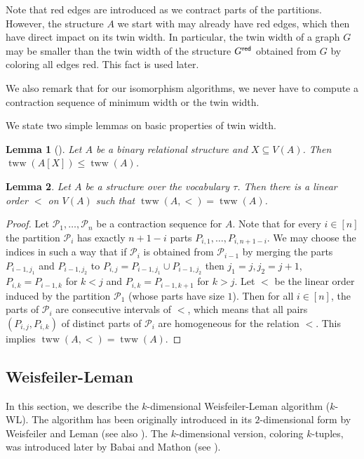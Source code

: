\PassOptionsToPackage{dvipsnames,svgnames}{xcolor}\documentclass[10pt,a4paper]{article}
\newtheorem{lemma}{Lemma}[section]
\newcommand{\CP}{{\mathcal P}}
\newcommand{\red}{{\sf red}}
\DeclareMathOperator{\tww}{tww}
\begin{document}
Note that red edges are introduced as we contract parts of the partitions.
However, the structure $A$ we start with may already have red edges, which then have direct impact on its twin width.
In particular, the twin width of a graph $G$ may be smaller than the twin width of the structure $G^{\red}$ obtained from $G$ by coloring all edges red.
This fact is used later.

We also remark that for our isomorphism algorithms, we never have to compute a contraction sequence of minimum width or the twin width.

We state two simple lemmas on basic properties of twin width.

\begin{lemma}[\cite{BonnetKTW22}]
 \label{lem:tww-hereditary}
 Let ${A}$ be a binary relational structure and $X \subseteq V({A})$.
 Then $\tww({A}[X]) \leq \tww({A})$.
\end{lemma}

\begin{lemma}
 \label{lem:twin-width-order}
 Let ${A}$ be a structure over the vocabulary $\tau$.
 Then there is a linear order $<$ on $V({A})$ such that $\tww({A},<) = \tww({A})$.
\end{lemma}

\begin{proof}
 Let $\CP_1,\dots,\CP_n$ be a contraction sequence for ${A}$.
 Note that for every $i \in [n]$ the partition $\CP_i$ has exactly $n+1-i$ parts $P_{i,1},\dots,P_{i,n+1-i}$.
 We may choose the indices in such a way that if $\CP_{i}$ is obtained from $\CP_{i-1}$ by merging the parts $P_{i-1,j_1}$ and $P_{i-1,j_2}$ to $P_{i,j}=P_{i-1,j_1}\cup P_{i-1,j_2}$ then $j_1=j,j_2=j+1$, $P_{i,k}=P_{i-1,k}$ for $k<j$ and $P_{i,k}=P_{i-1,k+1}$ for $k>j$.
 Let $<$ be the linear order induced by the partition $\CP_1$ (whose parts have size $1$).
 Then for all $i \in [n]$, the parts of $\CP_i$ are consecutive intervals of $<$, which means that all pairs $(P_{i,j},P_{i,k})$ of distinct parts of $\CP_i$ are homogeneous for the relation $<$.
 This implies $\tww({A},<) = \tww({A})$.
\end{proof}


\subsection{Weisfeiler-Leman}
\label{sec:wl-def}

In this section, we describe the $k$-dimensional Weisfeiler-Leman algorithm ($k$-WL).
The algorithm has been originally introduced in its $2$-dimensional form by Weisfeiler and Leman \cite{WeisfeilerL68} (see also \cite{Weisfeiler76}).
The $k$-dimensional version, coloring $k$\nobreakdash-tuples, was introduced later by Babai and Mathon (see \cite{CaiFI92}).
\end{document}
